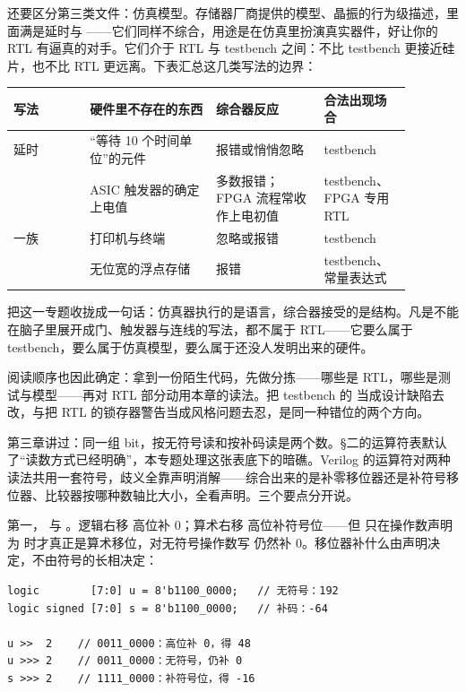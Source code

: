 还要区分第三类文件：仿真模型。存储器厂商提供的模型、晶振的行为级描述，里面满是延时与 ——它们同样不综合，用途是在仿真里扮演真实器件，好让你的 RTL 有逼真的对手。它们介于 RTL 与 testbench 之间：不比 testbench 更接近硅片，也不比 RTL 更远离。下表汇总这几类写法的边界：

\begin{longtable}{L{0.17\linewidth}L{0.29\linewidth}L{0.24\linewidth}L{0.18\linewidth}}
\toprule
写法 & 硬件里不存在的东西 & 综合器反应 & 合法出现场合 \\
\midrule
{} 延时 & “等待 10 个时间单位”的元件 & 报错或悄悄忽略 & testbench \\
 & ASIC 触发器的确定上电值 & 多数报错；FPGA 流程常收作上电初值 & testbench、FPGA 专用 RTL \\
 一族 & 打印机与终端 & 忽略或报错 & testbench \\
 & 无位宽的浮点存储 & 报错 & testbench、常量表达式 \\
\bottomrule
\end{longtable}

把这一专题收拢成一句话：仿真器执行的是语言，综合器接受的是结构。凡是不能在脑子里展开成门、触发器与连线的写法，都不属于 RTL——它要么属于 testbench，要么属于仿真模型，要么属于还没人发明出来的硬件。

阅读顺序也因此确定：拿到一份陌生代码，先做分拣——哪些是 RTL，哪些是测试与模型——再对 RTL 部分动用本章的读法。把 testbench 的  当成设计缺陷去改，与把 RTL 的锁存器警告当成风格问题去忍，是同一种错位的两个方向。


第三章讲过：同一组 bit，按无符号读和按补码读是两个数。§二的运算符表默认了“读数方式已经明确”，本专题处理这张表底下的暗礁。Verilog 的运算符对两种读法共用一套符号，歧义全靠声明消解——综合出来的是补零移位器还是补符号移位器、比较器按哪种数轴比大小，全看声明。三个要点分开说。

第一，\code{>>} 与 \code{>>>}。逻辑右移 \code{>>} 高位补 0；算术右移 \code{>>>} 高位补符号位——但 \code{>>>} 只在操作数声明为  时才真正是算术移位，对无符号操作数写 \code{>>>} 仍然补 0。移位器补什么由声明决定，不由符号的长相决定：

\begin{lstlisting}
logic        [7:0] u = 8'b1100_0000;   // 无符号：192
logic signed [7:0] s = 8'b1100_0000;   // 补码：-64

u >>  2    // 0011_0000：高位补 0，得 48
u >>> 2    // 0011_0000：无符号，仍补 0
s >>> 2    // 1111_0000：补符号位，得 -16
\end{lstlisting}

